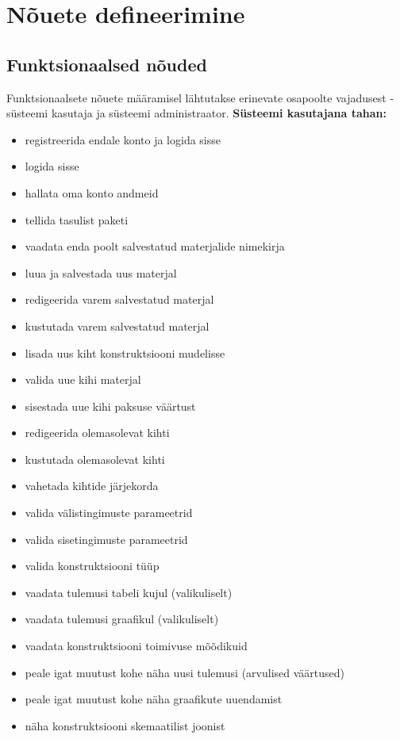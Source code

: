 \section{Nõuete defineerimine}
\label{chapters:analysis_requirements}
\subsection{Funktsionaalsed nõuded}
\label{subsec_func_req}
Funktsionaalsete nõuete määramisel lähtutakse erinevate osapoolte vajadusest - süsteemi kasutaja ja süsteemi 
administraator.
\textbf{Süsteemi kasutajana tahan:}
\begin{itemize}
    \item registreerida endale konto ja logida sisse
    \item logida sisse
    \item hallata oma konto andmeid
    \item tellida tasulist paketi
    \item vaadata enda poolt salvestatud materjalide nimekirja
    \item luua ja salvestada uus materjal
    \item redigeerida varem salvestatud materjal
    \item kustutada varem salvestatud materjal
    \item lisada uus kiht konstruktsiooni mudelisse
    \item valida uue kihi materjal
    \item sisestada uue kihi paksuse väärtust
    \item redigeerida olemasolevat kihti
    \item kustutada olemasolevat kihti
    \item vahetada kihtide järjekorda
    \item valida välistingimuste parameetrid
    \item valida sisetingimuste parameetrid
    \item valida konstruktsiooni tüüp
    \item vaadata tulemusi tabeli kujul (valikuliselt)
    \item vaadata tulemusi graafikul (valikuliselt)
    \item vaadata konstruktsiooni toimivuse mõõdikuid
    \item peale igat muutust kohe näha uusi tulemusi (arvulised väärtused)
    \item peale igat muutust kohe näha graafikute uuendamist
    \item näha konstruktsiooni skemaatilist joonist

\end{itemize}
